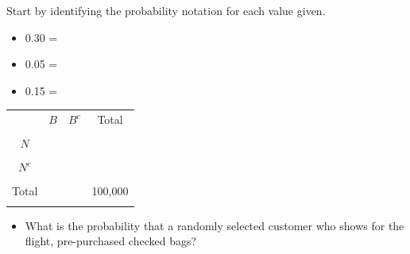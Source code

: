 \documentclass[
]{report}
\providecommand{\tightlist}{%
  \setlength{\itemsep}{0pt}\setlength{\parskip}{0pt}}
\begin{document}

Start by identifying the probability notation for each value given.

\begin{itemize}
\tightlist
\item
  0.30 =
\end{itemize}

\vspace{0.1in}

\begin{itemize}
\tightlist
\item
  0.05 =
\end{itemize}

\vspace{0.1in}

\begin{itemize}
\tightlist
\item
  0.15 =
\end{itemize}

\vspace{0.1in}


\begin{center}
\begin{tabular}{|c|c|c|c|} \hline
\hspace{0.8in} & \hspace{0.35in} $B$ \hspace{.35in} & \hspace{0.35in} $B^c$  \hspace{0.35in} & \hspace{0.3in} Total \hspace{0.3in} \\ 
& & & \\ \hline
$N$& & & \\ 
& & & \\ \hline
$N^c$& & & \\ 
& & & \\ \hline
Total & & & 100,000 \\ 
& & & \\ \hline
\end{tabular}
\end{center}
\vspace{.1in}

\begin{itemize}
\tightlist
\item
  What is the probability that a randomly selected customer who shows for the flight, pre-purchased checked bags?
\end{itemize}
\end{document}
